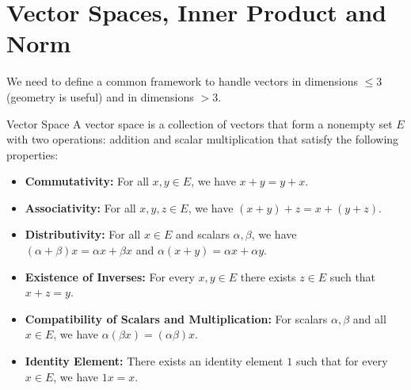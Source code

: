 \section{Vector Spaces, Inner Product and Norm}
We need to define a common framework to handle vectors in dimensions $\leq 3$ (geometry is useful) and in dimensions $> 3$.

\begin{definitionbox}{Vector Space}    
A vector space is a collection of vectors that form a nonempty set $E$ with two operations: addition and scalar multiplication that satisfy the following properties:

\begin{itemize}
    \item \textbf{Commutativity:} For all \( x, y \in E \), we have \( x + y = y + x \).
    \item \textbf{Associativity:} For all \( x, y, z \in E \), we have \( (x + y) + z = x + (y + z) \).
    \item \textbf{Distributivity:} For all \( x \in E \) and scalars \( \alpha, \beta \), we have \( (\alpha + \beta) x = \alpha x + \beta x \) and \( \alpha(x + y) = \alpha x + \alpha y \).
    \item \textbf{Existence of Inverses:} For every \( x, y \in E \) there exists \( z \in E \) such that \( x + z = y \).
    \item \textbf{Compatibility of Scalars and Multiplication:} For scalars \( \alpha, \beta \) and all \( x \in E \), we have \( \alpha(\beta x) = (\alpha\beta)x \).
    \item \textbf{Identity Element:} There exists an identity element \( 1 \) such that for every \( x \in E \), we have \( 1x = x \).
\end{itemize}
\end{definitionbox}


